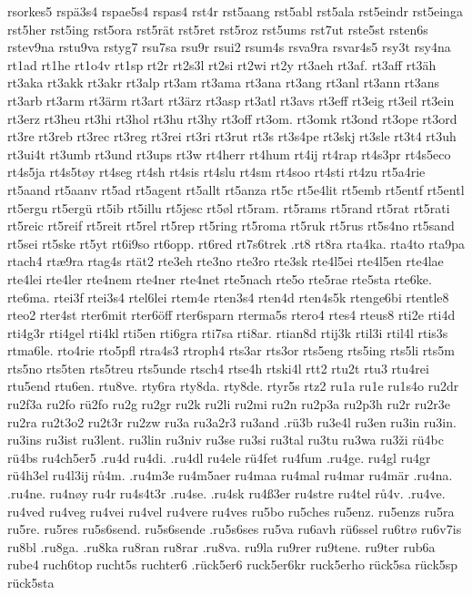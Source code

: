 {{rsorkes5
rspä3s4
rspae5s4
rspas4
rst4r
rst5aang
rst5abl
rst5ala
rst5eindr
rst5einga
rst5her
rst5ing
rst5ora
rst5rät
rst5ret
rst5roz
rst5ums
rst7ut
rste5st
rsten6s
rstev9na
rstu9va
rstyg7
rsu7sa
rsu9r
rsui2
rsum4s
rsva9ra
rsvar4s5
rsy3t
rsy4na
rt1ad
rt1he
rt1o4v
rt1sp
rt2r
rt2s3l
rt2si
rt2wi
rt2y
rt3aeh
rt3af.
rt3aff
rt3äh
rt3aka
rt3akk
rt3akr
rt3alp
rt3am
rt3ama
rt3ana
rt3ang
rt3anl
rt3ann
rt3ans
rt3arb
rt3arm
rt3ärm
rt3art
rt3ärz
rt3asp
rt3atl
rt3avs
rt3eff
rt3eig
rt3eil
rt3ein
rt3erz
rt3heu
rt3hi
rt3hol
rt3hu
rt3hy
rt3off
rt3om.
rt3omk
rt3ond
rt3ope
rt3ord
rt3re
rt3reb
rt3rec
rt3reg
rt3rei
rt3ri
rt3rut
rt3s
rt3s4pe
rt3skj
rt3sle
rt3t4
rt3uh
rt3ui4t
rt3umb
rt3und
rt3ups
rt3w
rt4herr
rt4hum
rt4ij
rt4rap
rt4s3pr
rt4s5eco
rt4s5ja
rt4s5tøy
rt4seg
rt4sh
rt4sis
rt4slu
rt4sm
rt4soo
rt4sti
rt4zu
rt5a4rie
rt5aand
rt5aanv
rt5ad
rt5agent
rt5allt
rt5anza
rt5c
rt5e4lit
rt5emb
rt5entf
rt5entl
rt5ergu
rt5ergü
rt5ib
rt5illu
rt5jesc
rt5øl
rt5ram.
rt5rams
rt5rand
rt5rat
rt5rati
rt5reic
rt5reif
rt5reit
rt5rel
rt5rep
rt5ring
rt5roma
rt5ruk
rt5rus
rt5s4no
rt5sand
rt5sei
rt5ske
rt5yt
rt6i9so
rt6opp.
rt6red
rt7s6trek
.rt8
rt8ra
rta4ka.
rta4to
rta9pa
rtach4
rtæ9ra
rtag4s
rtät2
rte3eh
rte3no
rte3ro
rte3sk
rte4l5ei
rte4l5en
rte4lae
rte4lei
rte4ler
rte4nem
rte4ner
rte4net
rte5nach
rte5o
rte5rae
rte5sta
rte6ke.
rte6ma.
rtei3f
rtei3s4
rtel6lei
rtem4e
rten3s4
rten4d
rten4s5k
rtenge6bi
rtentle8
rteo2
rter4st
rter6mit
rter6öff
rter6sparn
rterma5s
rtero4
rtes4
rteus8
rti2e
rti4d
rti4g3r
rti4gel
rti4kl
rti5en
rti6gra
rti7sa
rti8ar.
rtian8d
rtij3k
rtil3i
rtil4l
rtis3s
rtma6le.
rto4rie
rto5pfl
rtra4s3
rtroph4
rts3ar
rts3or
rts5eng
rts5ing
rts5li
rts5m
rts5no
rts5ten
rts5treu
rts5unde
rtsch4
rtse4h
rtski4l
rtt2
rtu2t
rtu3
rtu4rei
rtu5end
rtu6en.
rtu8ve.
rty6ra
rty8da.
rty8de.
rtyr5s
rtz2
ru1a
ru1e
ru1s4o
ru2dr
ru2f3a
ru2fo
rü2fo
ru2g
ru2gr
ru2k
ru2li
ru2mi
ru2n
ru2p3a
ru2p3h
ru2r
ru2r3e
ru2ra
ru2t3o2
ru2t3r
ru2zw
ru3a
ru3a2r3
ru3and
.rü3b
ru3e4l
ru3en
ru3in
ru3in.
ru3ins
ru3ist
ru3lent.
ru3lin
ru3niv
ru3se
ru3si
ru3tal
ru3tu
ru3wa
ru3ži
rü4bc
rü4bs
ru4ch5er5
.ru4d
ru4di.
.ru4dl
ru4ele
rü4fet
ru4fum
.ru4ge.
ru4gl
ru4gr
rü4h3el
ru4l3ij
rů4m.
.ru4m3e
ru4m5aer
ru4maa
ru4mal
ru4mar
ru4mär
.ru4na.
.ru4ne.
ru4nøy
ru4r
ru4s4t3r
.ru4se.
.ru4sk
ru4ß3er
ru4stre
ru4tel
rů4v.
.ru4ve.
ru4ved
ru4veg
ru4vei
ru4vel
ru4vere
ru4ves
ru5bo
ru5ches
ru5enz.
ru5enzs
ru5ra
ru5re.
ru5res
ru5s6send.
ru5s6sende
.ru5s6ses
ru5va
ru6avh
rü6ssel
ru6trø
ru6v7is
ru8bl
.ru8ga.
.ru8ka
ru8ran
ru8rar
.ru8va.
ru9la
ru9rer
ru9tene.
ru9ter
rub6a
rube4
ruch6top
rucht5s
ruchter6
.rück5er6
ruck5er6kr
ruck5erho
rück5sa
rück5sp
rück5sta
}}
